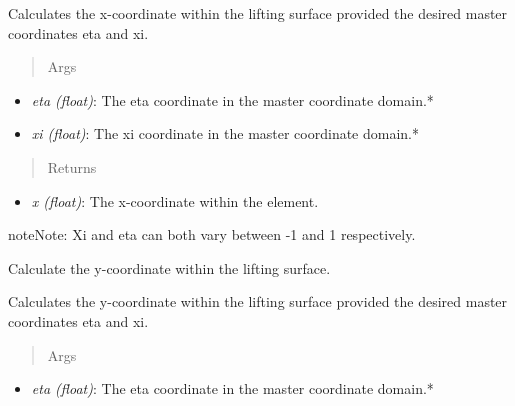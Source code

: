 \documentclass[letterpaper,10pt,english]{sphinxmanual}
\begin{document}
\begin{fulllineitems}
\begin{fulllineitems}
Calculates the x-coordinate within the lifting surface provided the
desired master coordinates eta and xi.
\begin{quote}\begin{description}
\item[{Args}] \leavevmode
\end{description}\end{quote}
\begin{itemize}
\item {} 
\emph{eta (float)}: The eta coordinate in the master coordinate domain.*

\item {} 
\emph{xi (float)}: The xi coordinate in the master coordinate domain.*

\end{itemize}
\begin{quote}\begin{description}
\item[{Returns}] \leavevmode
\end{description}\end{quote}
\begin{itemize}
\item {} 
\emph{x (float)}: The x-coordinate within the element.

\end{itemize}

\begin{notice}{note}{Note:}
Xi and eta can both vary between -1 and 1 respectively.
\end{notice}

\end{fulllineitems}


\begin{fulllineitems}
\label{aerodynamics:AeroComBAT.Aerodynamics.CAERO1.y}
Calculate the y-coordinate within the lifting surface.

Calculates the y-coordinate within the lifting surface provided the
desired master coordinates eta and xi.
\begin{quote}\begin{description}
\item[{Args}] \leavevmode
\end{description}\end{quote}
\begin{itemize}
\item {} 
\emph{eta (float)}: The eta coordinate in the master coordinate domain.*


\end{itemize}
\end{fulllineitems}
\end{fulllineitems}
\end{document}
